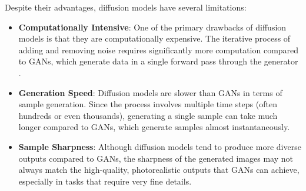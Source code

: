 Despite their advantages, diffusion models have several limitations:
\begin{itemize}
    \item \textbf{Computationally Intensive}: One of the primary drawbacks of diffusion models is that they are computationally expensive. The iterative process of adding and removing noise requires significantly more computation compared to GANs, which generate data in a single forward pass through the generator \citep{ho2020denoising}.
    \item \textbf{Generation Speed}: Diffusion models are slower than GANs in terms of sample generation. Since the process involves multiple time steps (often hundreds or even thousands), generating a single sample can take much longer compared to GANs, which generate samples almost instantaneously.
    \item \textbf{Sample Sharpness}: Although diffusion models tend to produce more diverse outputs compared to GANs, the sharpness of the generated images may not always match the high-quality, photorealistic outputs that GANs can achieve, especially in tasks that require very fine details.
\end{itemize}

